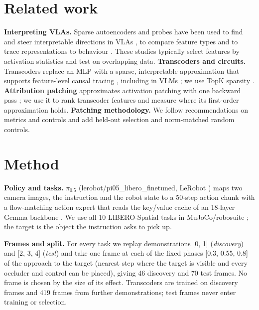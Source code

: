 \documentclass{article}
\begin{document}
\section{Related work}
\textbf{Interpreting VLAs.} Sparse autoencoders and probes have been used to find and steer interpretable directions in VLAs
\citep{haon2025mechanistic,buurmeijer2026observing,swann2026sparse,jin2026event}, to compare feature types \citep{grant2026features}
and to trace representations to behaviour \citep{shi2026vlatrace,zhang2026embodied}. These studies typically select features by
activation statistics and test on overlapping data. \textbf{Transcoders and circuits.} Transcoders replace an MLP with a sparse,
interpretable approximation that supports feature-level causal tracing \citep{dunefsky2024transcoders,ameisen2025circuit,lindsey2025biology},
including in VLMs \citep{damianos2026transcoders}; we use TopK sparsity \citep{gao2025scaling}. \textbf{Attribution patching}
approximates activation patching with one backward pass \citep{nanda2023attribution,syed2024attribution,kramar2024atp}; we use it to rank
transcoder features and measure where its first-order approximation holds. \textbf{Patching methodology.} We follow recommendations on
metrics and controls \citep{zhang2024towards,heimersheim2024patching} and add held-out selection and norm-matched random controls.

\section{Method}
\label{sec:method}
\textbf{Policy and tasks.} $\pi_{0.5}$ \citep{pi2025pi05} (lerobot/pi05_libero_finetuned, LeRobot \citep{cadene2024lerobot}) maps two
camera images, the instruction and the robot state to a 50-step action chunk with a flow-matching action expert \citep{lipman2023flow}
that reads the key/value cache of an 18-layer Gemma backbone \citep{gemma2024,beyer2024paligemma}. We use all 10
LIBERO-Spatial tasks \citep{liu2023libero} in MuJoCo/robosuite \citep{todorov2012mujoco,zhu2020robosuite}; the target is the object
the instruction asks to pick up.

\textbf{Frames and split.} For every task we replay demonstrations [0, 1] (\emph{discovery}) and
[2, 3, 4] (\emph{test}) and take one frame at each of the fixed phases [0.3, 0.55, 0.8] of the approach to the
target (nearest step where the target is visible and every occluder and control can be placed), giving 46 discovery
and 70 test frames. No frame is chosen by the size of its effect. Transcoders are trained on discovery frames and
419 frames from further demonstrations; test frames never enter training or selection.
\end{document}
